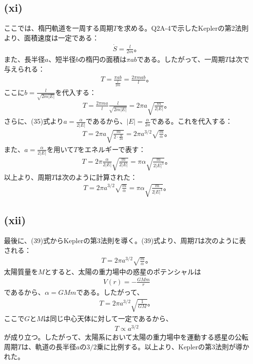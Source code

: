  \subsection*{(xi)}
  ここでは、楕円軌道を一周する周期$T$を求める。Q2A-4で示したKeplerの第2法則より、面積速度は一定である：
  \begin{align*}
    \dot{S}=\frac{l}{2m}。
  \end{align*}
  また、長半径$a$、短半径$b$の楕円の面積は$\pi ab$である。したがって、一周期$T$は次で与えられる：
  \begin{align*}
    T=\frac{\pi ab}{\frac{l}{2m}}=\frac{2\pi mab}{l}。
  \end{align*}
  ここに$b=\frac{l}{\sqrt{2m\left|E\right|}}$を代入する：
  \begin{align*}
    T=\frac{2\pi ma}{l}\frac{l}{\sqrt{2m\left|E\right|}}=2\pi a\sqrt{\frac{m}{2\left|E\right|}}。
  \end{align*}
  さらに、(35)式より$a=\frac{\alpha}{2\left|E\right|}$であるから、$\left|E\right|=\frac{\alpha}{2a}$である。これを代入する：
  \begin{align*}
    T=2\pi a\sqrt{\frac{m}{2\cdot\frac{\alpha}{2a}}}=2\pi a^{3/2}\sqrt{\frac{m}{\alpha}}。
  \end{align*}
  また、$a=\frac{\alpha}{2\left|E\right|}$を用いて$T$をエネルギーで表す：
  \begin{align*}
    T=2\pi\frac{\alpha}{2\left|E\right|}\sqrt{\frac{m}{2\left|E\right|}}=\pi\alpha\sqrt{\frac{m}{2\left|E\right|^3}}。
  \end{align*}
  以上より、周期$T$は次のように計算された：
  \begin{align*}
    T=2\pi a^{3/2}\sqrt{\frac{m}{\alpha}}=\pi\alpha\sqrt{\frac{m}{2\left|E\right|^3}}。\tag{39}
  \end{align*}

  \subsection*{(xii)}
  最後に、(39)式からKeplerの第3法則を導く。(39)式より、周期$T$は次のように表される：
  \begin{align*}
    T=2\pi a^{3/2}\sqrt{\frac{m}{\alpha}}。
  \end{align*}
  太陽質量を$M$とすると、太陽の重力場中の惑星のポテンシャルは
  \begin{align*}
    V(r)=-\frac{GMm}{r}
  \end{align*}
  であるから、$\alpha=GMm$である。したがって、
  \begin{align*}
    T=2\pi a^{3/2}\sqrt{\frac{1}{GM}}。
  \end{align*}
  ここで$G$と$M$は同じ中心天体に対して一定であるから、
  \begin{align*}
    T\propto a^{3/2}
  \end{align*}
  が成り立つ。したがって、太陽系において太陽の重力場中を運動する惑星の公転周期$T$は、軌道の長半径$a$の$3/2$乗に比例する。以上より、Keplerの第3法則が導かれた。

